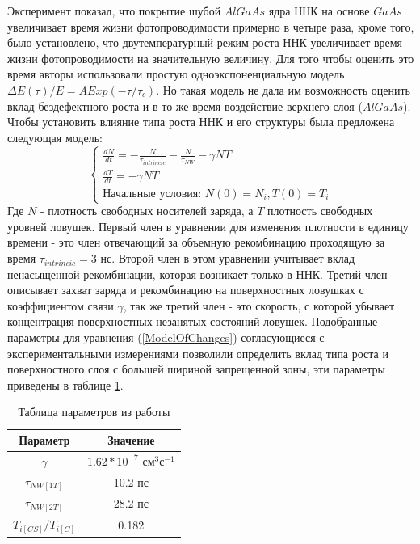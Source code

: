 \documentclass[a4paper,14pt,russian]{extreport}
\begin{document}
				Эксперимент показал, что покрытие шубой $AlGaAs$ ядра ННК на основе $GaAs$ увеличивает время жизни фотопроводимости примерно в четыре раза, кроме того, было установлено, что двутемпературный режим роста ННК увеличивает время жизни фотопроводимости на значительную величину. Для того чтобы оценить это время авторы использовали простую одноэкспоненциальную модель $\Delta E(\tau)/E = A Exp(-\tau/\tau_c)$. Но такая модель не дала им возможность оценить вклад бездефектного роста и в то же время воздействие верхнего слоя ($AlGaAs$). Чтобы установить влияние типа роста ННК и его структуры была предложена следующая модель:
				\begin{equation}\label{ModelOfChanges}
					\begin{cases}
   					\frac{dN}{dt} = -\frac{N}{\tau_{intrincic}} - \frac{N}{\tau_{NW}} - \gamma NT \\
					\frac{dT}{dt} = - \gamma NT \\
					\text{Начальные условия: } N(0) = N_i, T(0) = T_i
 					\end{cases}
				\end{equation}
				Где $N$ - плотность свободных носителей заряда, а $T$ плотность свободных уровней ловушек. Первый член в уравнении для изменения плотности в единицу времени - это член отвечающий за объемную рекомбинацию проходящую за время $\tau_{intrincic} = 3 \text{ нс}$. Второй член в этом уравнении учитывает вклад ненасыщенной рекомбинации, которая возникает только в ННК. Третий член описывает захват заряда и рекомбинацию на поверхностных ловушках с коэффициентом связи $\gamma$, так же третий член - это скорость, с которой убывает концентрация поверхностных незанятых состояний ловушек. Подобранные параметры для уравнения (\ref{ModelOfChanges}) согласующиеся с экспериментальными измерениями позволили определить вклад типа роста и поверхностного слоя с большей шириной запрещенной зоны, эти параметры приведены в таблице \ref{CoefficientsFromModelOfChanges}.
\begin{table}[h]
\centering
\caption{Таблица параметров из работы \cite{CurrentLifetime}}
\label{CoefficientsFromModelOfChanges}
\begin{tabular}{@{}cc@{}}
\toprule
Параметр                         & Значение                          \\ \midrule
$\gamma$                           & $1.62 *10^{-7}$ $\text{см}^3\text{с}^{-1}$ \\
$\tau_{NW[1T]}$             & 10.2 пс                           \\
$\tau_{NW[2T]}$             & 28.2 пс                           \\
$T_{i[CS]}/T_{i[C]}$				   & 0.182                             \\ \bottomrule
\end{tabular}
\end{table}
\end{document}
